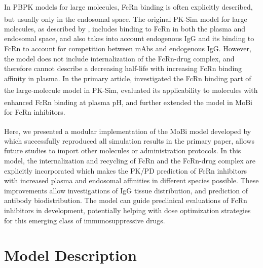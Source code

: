 \documentclass[fleqn,10pt]{physiome}
\begin{document}
In PBPK models for large molecules, FcRn binding is often explicitly described, but usually only in the endosomal space. The original PK-Sim\textsuperscript{\textregistered} model for large molecules, as described by \cite{niederalt2018generic}, includes binding to FcRn in both the plasma and endosomal space, and also takes into account endogenous IgG and its binding to FcRn to account for competition between mAbs and endogenous IgG. However, the model does not include internalization of the FcRn-drug complex, and therefore cannot describe a decreasing half-life with increasing FcRn binding affinity in plasma. In the primary article, \cite{de2023mechanistic} investigated the FcRn binding part of the large-molecule model in PK-Sim\textsuperscript{\textregistered}, evaluated its applicability to molecules with enhanced FcRn binding at plasma pH, and further extended the model in MoBi\textsuperscript{\textregistered} for FcRn inhibitors.

Here, we presented a modular implementation of the MoBi\textsuperscript{\textregistered} model developed by \cite{de2023mechanistic} which successfully reproduced all simulation results in the primary paper, allows future studies to import other molecules or administration protocols. In this model, the internalization and recycling of FcRn and the FcRn-drug complex are explicitly incorporated which makes the PK/PD prediction of FcRn inhibitors with increased plasma and endosomal affinities in different species possible. These improvements allow investigations of IgG tissue distribution, and prediction of antibody biodistribution. The model can guide preclinical evaluations of FcRn inhibitors in development, potentially helping with dose optimization strategies for this emerging class of immunosuppressive drugs. 


\section{Model Description}
\end{document}

